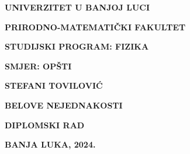 \begin{titlepage}
    \begin{minipage}[t][0.33\textheight][t]{\textwidth}
        \centering
        {\large \textbf{UNIVERZITET U BANJOJ LUCI} \par}
        {\large \textbf{PRIRODNO-MATEMATIČKI FAKULTET} \par}
        {\large \textbf{STUDIJSKI PROGRAM: FIZIKA} \par}
        {\large \textbf{SMJER: OPŠTI} \par}
      \end{minipage}
      
      \vfill %
      
      \begin{minipage}[t][0.33\textheight][c]{\textwidth}
        \centering
        {\textbf{STEFANI TOVILOVIĆ} \par}
        
    \vspace{1cm}

        {\Large \textbf{BELOVE NEJEDNAKOSTI}}
    
    \vspace{1cm}

        
        { \textbf{DIPLOMSKI RAD} \par}
      \end{minipage}
      
      \vfill %
      
      \begin{minipage}[t][0.33\textheight][b]{\textwidth}
        \centering
        {\large \textbf{BANJA LUKA, 2024.} \par}
      \end{minipage}

\end{titlepage}